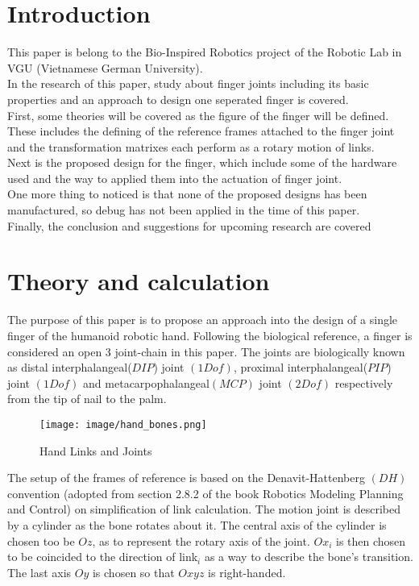 \documentclass[conference]{IEEEtran}
\begin{document}
\section{Introduction}
This paper is belong to the Bio-Inspired Robotics project of the Robotic Lab in VGU (Vietnamese German University).\\
	In the research of this paper, study about finger joints including its basic properties and an approach to design one seperated finger is covered.\\
    
First, some theories will be covered as the figure of the finger will be defined. These includes the defining of the reference frames attached to the finger joint and the transformation matrixes each perform as a rotary motion of links.
\\
Next is the proposed design for the finger, which include some of the hardware used and the way to applied them into the actuation of finger joint. 
\\
One more thing to noticed is that none of the proposed designs has been manufactured, so debug has not been applied in the time of this paper.
\\

Finally, the conclusion and suggestions for upcoming research are covered
\label{sec:introduction}

\noindent 

\section{Theory and calculation}

\noindent The purpose of this paper is to propose an approach into the design of a single finger of the humanoid robotic hand. Following the biological reference, a finger is considered an open 3 joint-chain in this paper. The joints are biologically known as distal interphalangeal($DIP$) joint $(1 Dof)$, proximal interphalangeal($PIP$) joint $( 1 Dof )$ and metacarpophalangeal$(MCP)$ joint $(2 Dof)$ respectively from the tip of nail to the palm. 

   \begin{figure}[thpb]
      \centering
      \texttt{[image: image/hand\_bones.png]}
      \caption{Hand Links and Joints}
      \label{fig:abstract_model_3}
   \end{figure}

The setup of the frames of reference is based on the Denavit-Hattenberg $(DH)$ convention (adopted from section 2.8.2 of the book Robotics Modeling Planning and Control) on simplification of link calculation. The motion joint is described by a cylinder as the bone rotates about it. The central axis of the cylinder is chosen too be $Oz$, as to represent the rotary axis of the joint. $Ox_i$ is then chosen to be coincided to the direction of link$_i$ as a way to describe the bone's transition. The last axis $Oy$ is chosen so that $Oxyz$ is right-handed.
\end{document}
